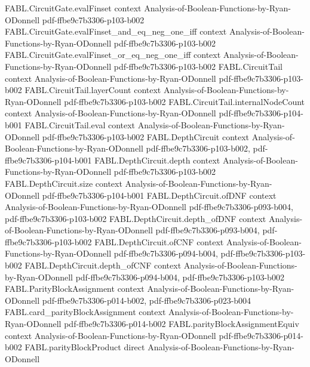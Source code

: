 \begin{theorem}
  {FABL.CircuitGate.evalFinset}
  {context}
  {Analysis-of-Boolean-Functions-by-Ryan-ODonnell}
  {pdf-ffbe9c7b3306-p103-b002}
\proofstep
  {FABL.CircuitGate.evalFinset_and_eq_neg_one_iff}
  {context}
  {Analysis-of-Boolean-Functions-by-Ryan-ODonnell}
  {pdf-ffbe9c7b3306-p103-b002}
\proofstep
  {FABL.CircuitGate.evalFinset_or_eq_neg_one_iff}
  {context}
  {Analysis-of-Boolean-Functions-by-Ryan-ODonnell}
  {pdf-ffbe9c7b3306-p103-b002}
\proofstep
  {FABL.CircuitTail}
  {context}
  {Analysis-of-Boolean-Functions-by-Ryan-ODonnell}
  {pdf-ffbe9c7b3306-p103-b002}
\proofstep
  {FABL.CircuitTail.layerCount}
  {context}
  {Analysis-of-Boolean-Functions-by-Ryan-ODonnell}
  {pdf-ffbe9c7b3306-p103-b002}
\proofstep
  {FABL.CircuitTail.internalNodeCount}
  {context}
  {Analysis-of-Boolean-Functions-by-Ryan-ODonnell}
  {pdf-ffbe9c7b3306-p104-b001}
\proofstep
  {FABL.CircuitTail.eval}
  {context}
  {Analysis-of-Boolean-Functions-by-Ryan-ODonnell}
  {pdf-ffbe9c7b3306-p103-b002}
\proofstep
  {FABL.DepthCircuit}
  {context}
  {Analysis-of-Boolean-Functions-by-Ryan-ODonnell}
  {pdf-ffbe9c7b3306-p103-b002,
    pdf-ffbe9c7b3306-p104-b001}
\proofstep
  {FABL.DepthCircuit.depth}
  {context}
  {Analysis-of-Boolean-Functions-by-Ryan-ODonnell}
  {pdf-ffbe9c7b3306-p103-b002}
\proofstep
  {FABL.DepthCircuit.size}
  {context}
  {Analysis-of-Boolean-Functions-by-Ryan-ODonnell}
  {pdf-ffbe9c7b3306-p104-b001}
\proofstep
  {FABL.DepthCircuit.ofDNF}
  {context}
  {Analysis-of-Boolean-Functions-by-Ryan-ODonnell}
  {pdf-ffbe9c7b3306-p093-b004,
    pdf-ffbe9c7b3306-p103-b002}
\proofstep
  {FABL.DepthCircuit.depth_ofDNF}
  {context}
  {Analysis-of-Boolean-Functions-by-Ryan-ODonnell}
  {pdf-ffbe9c7b3306-p093-b004,
    pdf-ffbe9c7b3306-p103-b002}
\proofstep
  {FABL.DepthCircuit.ofCNF}
  {context}
  {Analysis-of-Boolean-Functions-by-Ryan-ODonnell}
  {pdf-ffbe9c7b3306-p094-b004,
    pdf-ffbe9c7b3306-p103-b002}
\proofstep
  {FABL.DepthCircuit.depth_ofCNF}
  {context}
  {Analysis-of-Boolean-Functions-by-Ryan-ODonnell}
  {pdf-ffbe9c7b3306-p094-b004,
    pdf-ffbe9c7b3306-p103-b002}
\proofstep
  {FABL.ParityBlockAssignment}
  {context}
  {Analysis-of-Boolean-Functions-by-Ryan-ODonnell}
  {pdf-ffbe9c7b3306-p014-b002,
    pdf-ffbe9c7b3306-p023-b004}
\proofstep
  {FABL.card_parityBlockAssignment}
  {context}
  {Analysis-of-Boolean-Functions-by-Ryan-ODonnell}
  {pdf-ffbe9c7b3306-p014-b002}
\proofstep
  {FABL.parityBlockAssignmentEquiv}
  {context}
  {Analysis-of-Boolean-Functions-by-Ryan-ODonnell}
  {pdf-ffbe9c7b3306-p014-b002}
\proofstep
  {FABL.parityBlockProduct}
  {direct}
  {Analysis-of-Boolean-Functions-by-Ryan-ODonnell}

\end{theorem}

